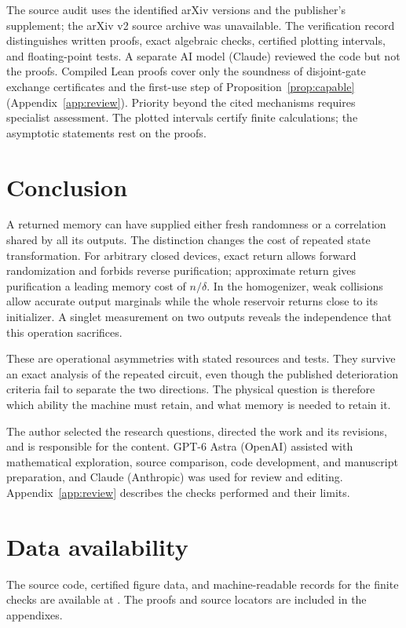 \documentclass[aps,pra,reprint,superscriptaddress,longbibliography,nofootinbib,floatfix]{revtex4-2}
\begin{document}
The source audit uses the identified arXiv versions and the publisher's supplement; the arXiv v2 source archive was unavailable. The verification record distinguishes written proofs, exact algebraic checks, certified plotting intervals, and floating-point tests. A separate AI model (Claude) reviewed the code but not the proofs. Compiled Lean proofs cover only the soundness of disjoint-gate exchange certificates and the first-use step of Proposition~\ref{prop:capable} (Appendix~\ref{app:review}). Priority beyond the cited mechanisms requires specialist assessment. The plotted intervals certify finite calculations; the asymptotic statements rest on the proofs.

\section{Conclusion}

A returned memory can have supplied either fresh randomness or a correlation shared by all its outputs. The distinction changes the cost of repeated state transformation. For arbitrary closed devices, exact return allows forward randomization and forbids reverse purification; approximate return gives purification a leading memory cost of $n/\delta$. In the homogenizer, weak collisions allow accurate output marginals while the whole reservoir returns close to its initializer. A singlet measurement on two outputs reveals the independence that this operation sacrifices.

These are operational asymmetries with stated resources and tests. They survive an exact analysis of the repeated circuit, even though the published deterioration criteria fail to separate the two directions. The physical question is therefore which ability the machine must retain, and what memory is needed to retain it.

\begin{acknowledgments}
The author selected the research questions, directed the work and its revisions, and is responsible for the content. GPT-6 Astra (OpenAI) assisted with mathematical exploration, source comparison, code development, and manuscript preparation, and Claude (Anthropic) was used for review and editing. Appendix~\ref{app:review} describes the checks performed and their limits.
\end{acknowledgments}

\section*{Data availability}
{\setlength{\rightskip}{0pt plus 1fil}The source code, certified figure data, and machine-readable records for the finite checks are available at \repolink{}. The proofs and source locators are included in the appendixes.\par}
\end{document}
